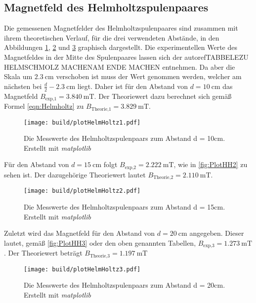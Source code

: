 \subsection{Magnetfeld des Helmholtzspulenpaares}
\label{subsec:A_Helmholtz}
Die gemessenen Magnetfelder des Helmholtzspulenpaares sind zusammen mit ihrem theoretischen Verlauf, für die drei verwendeten Abstände, in den Abbildungen \ref{fig:PlotHH1}, \ref{fig:PlotHH2} und \ref{fig:PlotHH3} 
graphisch dargestellt. Die experimentellen Werte des Magnetfeldes in der Mitte des Spulenpaares lassen sich der autoref{TABBELEZU HELMSCHMOLZ MACHENAM ENDE MACHEN} entnehmen. Da aber die Skala um $2.3\:\unit{\centi\metre}$ verschoben ist muss der Wert
genommen werden, welcher am nächsten bei $\frac{d}{2} - 2.3\:\unit{\centi\metre}$ liegt. Daher ist für den Abstand von $d = 10\:\unit{\centi\metre}$ das Magnetfeld $B_{\text{exp,1}} = 3.840\:\unit{\milli\tesla}$.
Der Theoriewert dazu berechnet sich gemäß Formel \eqref{eqn:Helmholtz} zu $B_{\text{Theorie,1}} = 3.829\:\unit{\milli\tesla}$.
\begin{figure}[H]
    \centering
    \caption{Die Messwerte des Helmholtzspulenpaars zum Abstand d = 10cm. Erstellt mit \textit{matplotlib} \cite{matplotlib}}
    \label{fig:PlotHH1}
    \texttt{[image: build/plotHelmHoltz1.pdf]}
\end{figure}
Für den Abstand von $d = 15\:\unit{\centi\metre}$ folgt $B_{\text{exp,2}} = 2.222\:\unit{\milli\tesla}$, wie in \autoref{fig:PlotHH2} zu sehen ist. Der dazugehörige Theoriewert lautet $B_{\text{Theorie,2}} = 2.110\:\unit{\milli\tesla}$.
\begin{figure}[H]
    \centering
    \caption{Die Messwerte des Helmholtzspulenpaars zum Abstand d = 15cm. Erstellt mit \textit{matplotlib} \cite{matplotlib}}
    \label{fig:PlotHH2}
    \texttt{[image: build/plotHelmHoltz2.pdf]}
\end{figure}
Zuletzt wird das Magnetfeld für den Abstand von $d = 20\:\unit{\centi\metre}$ angegeben. Dieser lautet, gemäß \autoref{fig:PlotHH3} oder den oben genannten Tabellen, $B_{\text{exp,3}} = 1.273\:\unit{\milli\tesla}$. Der Theoriewert beträgt $B_{\text{Theorie,3}} = 1.197\:\unit{\milli\tesla}$
\begin{figure}[H]
    \centering
    \caption{Die Messwerte des Helmholtzspulenpaars zum Abstand d = 20cm. Erstellt mit \textit{matplotlib} \cite{matplotlib}}
    \label{fig:PlotHH3}
    \texttt{[image: build/plotHelmHoltz3.pdf]}
\end{figure}
